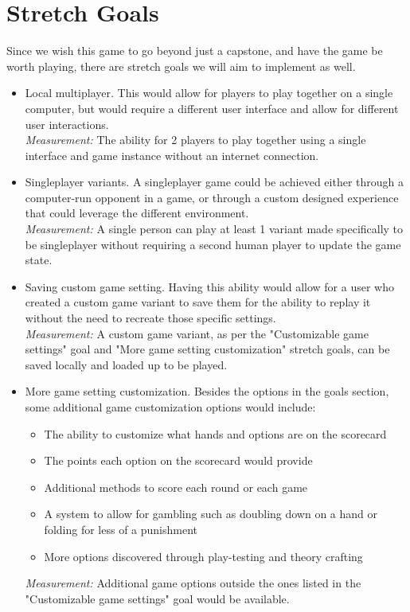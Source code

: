 \documentclass{article}
\begin{document}
\section{Stretch Goals}

Since we wish this game to go beyond just a capstone, and have the game be worth playing, there are stretch goals we will aim to implement as well.

\begin{itemize}
	\item Local multiplayer. This would allow for players to play together on a single computer, but would require a different user interface and allow for different user interactions.\\
	\textit{Measurement:} The ability for 2 players to play together using a single interface and game instance without an internet connection.
	
	\item Singleplayer variants. A singleplayer game could be achieved either through a computer-run opponent in a game, or through a custom designed experience that could leverage the different environment.\\
	\textit{Measurement:} A single person can play at least 1 variant made specifically to be singleplayer without requiring a second human player to update the game state.
	
	\item Saving custom game setting. Having this ability would allow for a user who created a custom game variant to save them for the ability to replay it without the need to recreate those specific settings.\\
	\textit{Measurement:} A custom game variant, as per the "Customizable game settings" goal and "More game setting customization" stretch goals, can be saved locally and loaded up to be played.
	
	\item More game setting customization. Besides the options in the goals section, some additional game customization options would include:
	\begin{itemize}
        \item The ability to customize what hands and options are on the scorecard
        \item The points each option on the scorecard would provide
        \item Additional methods to score each round or each game
        \item A system to allow for gambling such as doubling down on a hand or folding for less of a punishment
        \item More options discovered through play-testing and theory crafting
    \end{itemize}
	\textit{Measurement:} Additional game options outside the ones listed in the "Customizable game settings" goal would be available.
	

\end{itemize}
\end{document}
